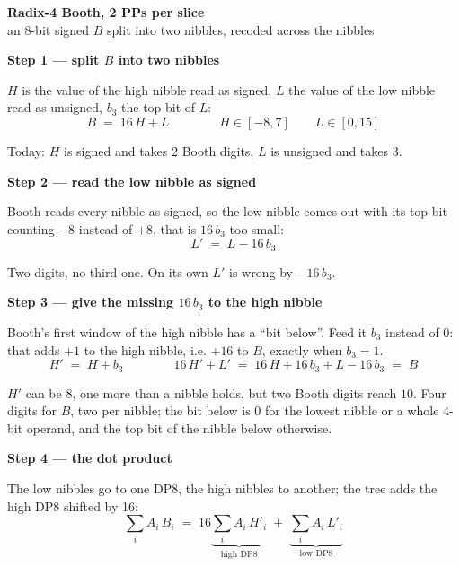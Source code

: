 \documentclass[fleqn]{article}
\begin{document}
\begin{center}
{\LARGE \textbf{Radix-4 Booth, 2 PPs per slice}}\\[4pt]
{\large an 8-bit signed $B$ split into two nibbles, recoded across the nibbles}
\end{center}

\vspace{3em}

\noindent\textbf{Step 1 --- split $B$ into two nibbles}

\noindent $H$ is the value of the high nibble read as signed, $L$ the value of the low nibble
read as unsigned, $b_3$ the top bit of $L$:
\[
B \;=\; 16\,H + L
\qquad\qquad
H \in [-8, 7]
\qquad
L \in [0, 15]
\]

\noindent Today: $H$ is signed and takes 2 Booth digits, $L$ is unsigned and takes 3.

\vspace{0.5em}

\noindent\textbf{Step 2 --- read the low nibble as signed}

\noindent Booth reads every nibble as signed, so the low nibble comes out with its top bit
counting $-8$ instead of $+8$, that is $16\,b_3$ too small:
\[
L' \;=\; L - 16\,b_3
\]

\noindent Two digits, no third one. On its own $L'$ is wrong by $-16\,b_3$.

\vspace{0.5em}

\noindent\textbf{Step 3 --- give the missing $16\,b_3$ to the high nibble}

\noindent Booth's first window of the high nibble has a ``bit below''. Feed it $b_3$ instead of
$0$: that adds $+1$ to the high nibble, i.e. $+16$ to $B$, exactly when $b_3 = 1$.
\[
H' \;=\; H + b_3
\qquad\qquad
16\,H' + L' \;=\; 16\,H + 16\,b_3 + L - 16\,b_3 \;=\; B
\]

\noindent $H'$ can be $8$, one more than a nibble holds, but two Booth digits reach $10$.
Four digits for $B$, two per nibble; the bit below is $0$ for the lowest nibble or a whole
4-bit operand, and the top bit of the nibble below otherwise.

\vspace{0.5em}

\noindent\textbf{Step 4 --- the dot product}

\noindent The low nibbles go to one DP8, the high nibbles to another; the tree adds the high
DP8 shifted by 16:
\[
\sum_{i} A_i \, B_i
  \;=\; 16 \underbrace{\sum_{i} A_i \, H'_i}_{\textstyle \text{high DP8}}
  \;+\; \underbrace{\sum_{i} A_i \, L'_i}_{\textstyle \text{low DP8}}
\]
\end{document}
